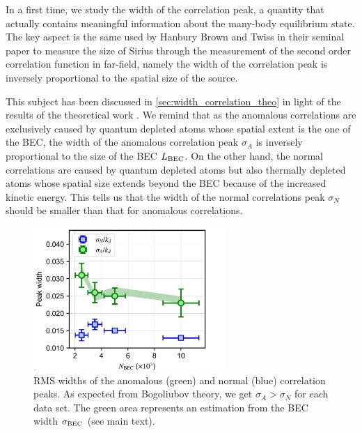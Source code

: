 \label{ref:exp_width_corr}

In a first time, we study the width of the correlation peak, a quantity that actually contains meaningful information about the many-body equilibrium state. The key aspect is the same used by Hanbury Brown and Twiss in their seminal paper to measure the size of Sirius through the measurement of the second order correlation function in far-field, namely the width of the correlation peak is inversely proportional to the spatial size of the source. 


This subject has been discussed in \ref{sec:width_correlation_theo} in light of the results of the theoretical work \cite{butera2020}. We remind that as the anomalous correlations are exclusively caused by quantum depleted atoms whose spatial extent is the one of the BEC, the width of the anomalous correlation peak $\sigma_A$ is inversely proportional to the size of the BEC $L_{\rm{BEC}}$. On the other hand, the normal correlations are caused by quantum depleted atoms but also thermally depleted atoms whose spatial size extends beyond the BEC because of the increased kinetic energy. This tells us that the width of the normal correlations peak $\sigma_N$ should be smaller than that for anomalous correlations.

\begin{figure}
    \centering
    \includegraphics[width=0.65\textwidth]{Fig/Chapter4/widths.png}
    \caption[RMS widths of the anomalous and normal correlation peaks]{RMS widths of the anomalous (green) and normal (blue) correlation peaks. As expected from Bogoliubov theory, we get $\sigma_A > \sigma_N$ for each data set. The green area represents an estimation from the BEC width $\sigma_{\rm{BEC}}$ (see main text).}
    \label{fig:width}
\end{figure}

